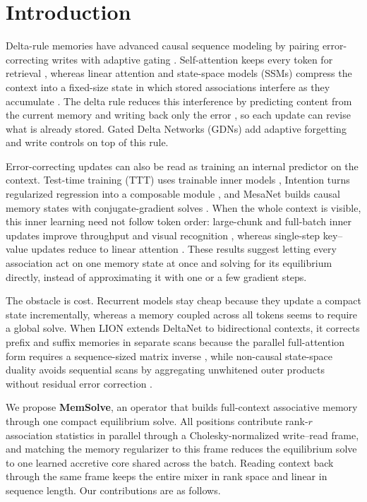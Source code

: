 \documentclass[10pt,twocolumn]{article}
\begin{document}
\section{Introduction}

Delta-rule memories have advanced causal sequence modeling by pairing
error-correcting writes with adaptive gating
\cite{yang2025deltanet,yang2025gdn,siems2025deltaproduct,kimi2025linear,hatamizadeh2026gdn2}.
Self-attention keeps every token for retrieval \cite{vaswani2017attention},
whereas linear attention and state-space models (SSMs) compress the context
into a fixed-size state in which stored associations interfere as they
accumulate \cite{katharopoulos2020linear,gu2024mamba,dao2024mamba2}.
The delta rule reduces this interference by predicting content from the
current memory and writing back only the error
\cite{schlag2021fastweights,yang2025deltanet,liu2024longhorn}, so each update
can revise what is already stored.
Gated Delta Networks (GDNs) add adaptive forgetting and write controls on top
of this rule.

Error-correcting updates can also be read as training an internal predictor on
the context.
Test-time training (TTT) uses trainable inner models
\cite{sun2025ttt,behrouz2025titans,behrouz2026atlas}, Intention turns
regularized regression into a composable module \cite{garnelo2023intention},
and MesaNet builds causal memory states with conjugate-gradient solves
\cite{vonoswald2026mesanet}.
When the whole context is visible, this inner learning need not follow token
order: large-chunk and full-batch inner updates improve throughput and visual
recognition \cite{zhang2026lact,han2026vit3}, whereas single-step key--value
updates reduce to linear attention \cite{liu2026kvbinding}.
These results suggest letting every association act on one memory state at
once and solving for its equilibrium directly, instead of approximating it
with one or a few gradient steps.

The obstacle is cost.
Recurrent models stay cheap because they update a compact state
incrementally, whereas a memory coupled across all tokens seems to require a
global solve.
When LION extends DeltaNet to bidirectional contexts, it corrects prefix and
suffix memories in separate scans because the parallel full-attention form
requires a sequence-sized matrix inverse \cite{afzal2025lion}, while
non-causal state-space duality avoids sequential scans by aggregating
unwhitened outer products without residual error correction \cite{shi2025vssd}.

We propose \textbf{MemSolve}, an operator that builds full-context associative
memory through one compact equilibrium solve.
All positions contribute rank-$r$ association statistics in parallel through a
Cholesky-normalized write--read frame, and matching the memory regularizer to
this frame reduces the equilibrium solve to one learned accretive core shared
across the batch.
Reading context back through the same frame keeps the entire mixer in rank
space and linear in sequence length.
Our contributions are as follows.
\end{document}
